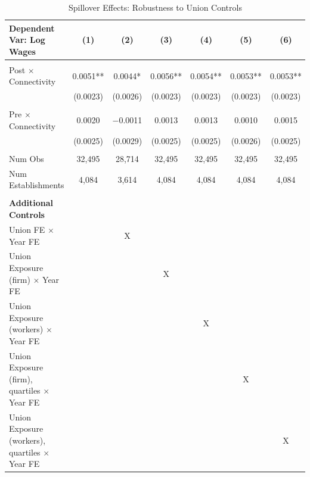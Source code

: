 \begin{table}[]
\centering
\caption{Spillover Effects: Robustness to Union Controls}
\label{tab:spill_union_controls}
\footnotesize
\begin{threeparttable}
\begin{tabular}{lcccccc}
\toprule\toprule
\textbf{Dependent Var: Log Wages} & (1) & (2) & (3) & (4) & (5) & (6) \\ \midrule
 &  &  &  &  &  &  & \\
Post $\times$ Connectivity & 0.0051** & 0.0044* & 0.0056** & 0.0054** & 0.0053** & 0.0053** \\
 & (0.0023) & (0.0026) & (0.0023) & (0.0023) & (0.0023) & (0.0023) \\
 &  &  &  &  &  &  & \\
Pre $\times$ Connectivity & 0.0020 & $-$0.0011 & 0.0013 & 0.0013 & 0.0010 & 0.0015 \\
 & (0.0025) & (0.0029) & (0.0025) & (0.0025) & (0.0026) & (0.0025) \\
 &  &  &  &  &  &  & \\
Num Obs & 32{,}495 & 28{,}714 & 32{,}495 & 32{,}495 & 32{,}495 & 32{,}495 \\
Num Establishments & 4{,}084 & 3{,}614 & 4{,}084 & 4{,}084 & 4{,}084 & 4{,}084 \\ \midrule
 &  &  &  &  &  & \\
\textbf{Additional Controls} & & & & & & \\
Union FE $\times$ Year FE & & X & & & & \\
Union Exposure (firm) $\times$ Year FE & & & X & & & \\
Union Exposure (workers) $\times$ Year FE & & & & X & & \\
Union Exposure (firm), quartiles $\times$ Year FE & & & & & X & \\
Union Exposure (workers), quartiles $\times$ Year FE & & & & & & X \\
\bottomrule
\end{tabular}
\scriptsize
\begin{tablenotes}

\end{tablenotes}
\end{threeparttable}
\end{table}

